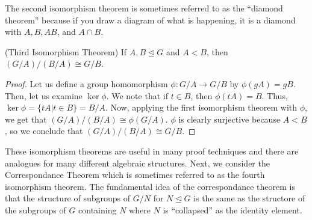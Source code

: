 \documentclass[11pt,leqno,oneside]{amsart}
\newcommand{\subgroup}{\mathrel{<}}
\newcommand{\normsubgroup}{\mathrel{\unlhd}}
\newcommand{\isom}{\mathrel{\cong}}
\begin{document}
The second isomorphism theorem is sometimes referred to as the ``diamond
theorem'' because if you draw a diagram of what is happening, it is a diamond
with $A, B, AB$, and $A \cap B$.
\begin{cor}
    (Third Isomorphism Theorem) If $A,B \normsubgroup G$ and $A \subgroup B$, then $(G/A)/(B/A) \isom G/B$.
\end{cor}
\begin{proof}
    Let us define a group homomorphism $\phi: G/A \to G/B$ by $\phi(gA) = gB$.
    Then, let us examine $\ker \phi$. We note that if $t \in B$,
    then $\phi(tA) = B$. Thus, $\ker \phi = \{tA | t \in B\} = B/A$. Now, applying the first
    isomorphism theorem with $\phi$, we get that $(G/A)/(B/A) \isom \phi(G/A)$.
    $\phi$ is clearly surjective because $A \subgroup B$, so we conclude that
    $(G/A)/(B/A) \isom G/B$.
\end{proof}

These isomorphism theorems are useful in many proof techniques and there are
analogues for many different algebraic structures. Next, we consider the
Correspondance Theorem which is sometimes referred to as the fourth isomorphism
theorem. The fundamental idea of the correspondance theorem is that the
structure of subgroups of $G/N$ for $N \normsubgroup G$ is the same as the
structore of the subgroups of $G$ containing $N$ where $N$ is ``collapsed'' as
the identity element.
\end{document}
